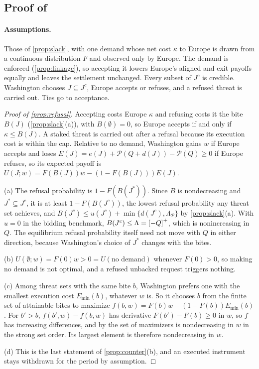 \subsection{Proof of \texorpdfstring{}{refusals and executed threats}}

\paragraph{Assumptions.} Those of \cref{prop:slack}, with one demand whose net cost $\kappa$ to Europe is drawn from a continuous distribution $F$ and observed only by Europe. The demand is enforced (\cref{prop:linkage}), so accepting it lowers Europe's aligned and exit payoffs equally and leaves the settlement unchanged. Every subset of $J^c$ is credible. Washington chooses $J\subseteq J^c$, Europe accepts or refuses, and a refused threat is carried out. Ties go to acceptance.

\begin{proof}[Proof of \cref{prop:refusal}]
Accepting costs Europe $\kappa$ and refusing costs it the bite $B(J)$ (\cref{prop:slack}(a)), with $B(\emptyset)=0$, so Europe accepts if and only if $\kappa\le B(J)$. A staked threat is carried out after a refusal because its execution cost is within the cap. Relative to no demand, Washington gains $w$ if Europe accepts and loses $E(J)=e(J)+\mathcal P(Q+d(J))-\mathcal P(Q)\ge 0$ if Europe refuses, so its expected payoff is $U(J;w)=F(B(J))w-(1-F(B(J)))E(J)$.

(a) The refusal probability is $1-F(B(J^*))$. Since $B$ is nondecreasing and $J^*\subseteq J^c$, it is at least $1-F(B(J^c))$, the lowest refusal probability any threat set achieves, and $B(J^c)\le u(J^c)+\min\{d(J^c),\Lambda_{\mathcal P}\}$ by \cref{prop:slack}(a). With $u=0$ in the bidding benchmark, $B(J^c)\le\Lambda=\left[-Q\right]^{+}$, which is nonincreasing in $Q$. The equilibrium refusal probability itself need not move with $Q$ in either direction, because Washington's choice of $J^*$ changes with the bites.

(b) $U(\emptyset;w)=F(0)w>0=U(\text{no demand})$ whenever $F(0)>0$, so making no demand is not optimal, and a refused unbacked request triggers nothing.

(c) Among threat sets with the same bite $b$, Washington prefers one with the smallest execution cost $E_{\min}(b)$, whatever $w$ is. So it chooses $b$ from the finite set of attainable bites to maximize $f(b,w)=F(b)w-(1-F(b))E_{\min}(b)$. For $b'>b$, $f(b',w)-f(b,w)$ has derivative $F(b')-F(b)\ge 0$ in $w$, so $f$ has increasing differences, and by \citet[Theorem 4]{milgrom1994monotone} the set of maximizers is nondecreasing in $w$ in the strong set order. Its largest element is therefore nondecreasing in $w$.

(d) This is the last statement of \cref{prop:counter}(b), and an executed instrument stays withdrawn for the period by assumption.
\end{proof}


